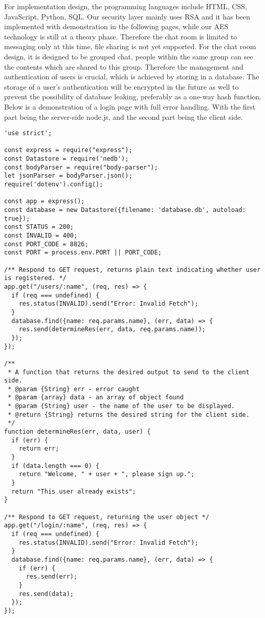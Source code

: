 \documentclass[12pt, border = 4pt, multi]{article} %
\begin{document}
\begin{multicols}{2}
For implementation design, the programming languages include HTML, CSS, JavaScript, Python, SQL. Our security layer mainly uses RSA and it has been implemented with demonstration in the following pages, while our AES technology is still at a theory phase. Therefore the chat room is limited to messaging only at this time, file sharing is not yet supported. For the chat room design, it is designed to be grouped chat, people within the same group can see the contents which are shared to this group. Therefore the management and authentication of users is crucial, which is achieved by storing in a database. The storage of a user's authentication will be encrypted in the future as well to prevent the possibility of database leaking, preferably as a one-way hash function. Below is a demonstration of a login page with full error handling. With the first part being the server-side node.js, and the second part being the client side.\\

\begin{lstlisting}
'use strict';

const express = require("express");
const Datastore = require('nedb');
const bodyParser = require("body-parser");
let jsonParser = bodyParser.json();
require('dotenv').config();

const app = express();
const database = new Datastore({filename: 'database.db', autoload: true});
const STATUS = 200;
const INVALID = 400;
const PORT_CODE = 8826;
const PORT = process.env.PORT || PORT_CODE;

/** Respond to GET request, returns plain text indicating whether user is registered. */
app.get("/users/:name", (req, res) => {
  if (req === undefined) {
    res.status(INVALID).send("Error: Invalid Fetch");
  }
  database.find({name: req.params.name}, (err, data) => {
    res.send(determineRes(err, data, req.params.name));
  });
});

/**
 * A function that returns the desired output to send to the client side.
 * @param {String} err - error caught
 * @param {array} data - an array of object found
 * @param {String} user - the name of the user to be displayed.
 * @return {String} returns the desired string for the client side.
 */
function determineRes(err, data, user) {
  if (err) {
    return err;
  }
  if (data.length === 0) {
    return "Welcome, " + user + ", please sign up.";
  }
  return "This user already exists";
}

/** Respond to GET request, returning the user object */
app.get("/login/:name", (req, res) => {
  if (req === undefined) {
    res.status(INVALID).send("Error: Invalid Fetch");
  }
  database.find({name: req.params.name}, (err, data) => {
    if (err) {
      res.send(err);
    }
    res.send(data);
  });
});


\end{lstlisting}
\end{multicols}
\end{document}
